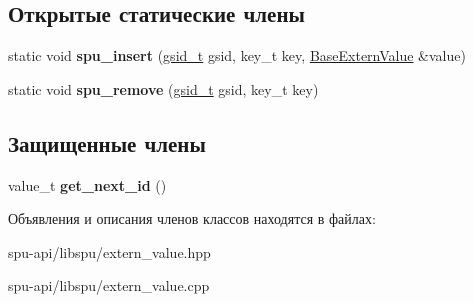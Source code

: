 \subsection*{Открытые статические члены}
\begin{DoxyCompactItemize}
\item 
\mbox{\label{class_s_p_u_1_1_base_extern_value_aba9cadc3d83388611b757a6b14eb27e6}} 
static void {\bfseries spu\+\_\+insert} (\hyperlink{structgsid__container}{gsid\+\_\+t} gsid, key\+\_\+t key, \hyperlink{class_s_p_u_1_1_base_extern_value}{Base\+Extern\+Value} \&value)
\item 
\mbox{\label{class_s_p_u_1_1_base_extern_value_a96a28d828127bb86c7f91f135565b3ec}} 
static void {\bfseries spu\+\_\+remove} (\hyperlink{structgsid__container}{gsid\+\_\+t} gsid, key\+\_\+t key)
\end{DoxyCompactItemize}
\subsection*{Защищенные члены}
\begin{DoxyCompactItemize}
\item 
\mbox{\label{class_s_p_u_1_1_base_extern_value_a07a83e438eb4f53548f3382aace21b65}} 
value\+\_\+t {\bfseries get\+\_\+next\+\_\+id} ()
\end{DoxyCompactItemize}


Объявления и описания членов классов находятся в файлах\+:\begin{DoxyCompactItemize}
\item 
spu-\/api/libspu/extern\+\_\+value.\+hpp\item 
spu-\/api/libspu/extern\+\_\+value.\+cpp\end{DoxyCompactItemize}
